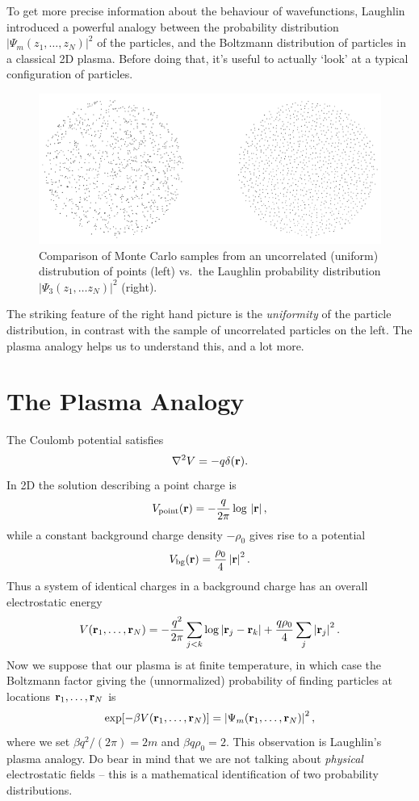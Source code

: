 \documentclass[
  letterpaper,
  DIV=11,
  numbers=noendperiod]{scrreprt}
\begin{document}
To get more precise information about the behaviour of wavefunctions,
Laughlin introduced a powerful analogy between the probability
distribution \(\lvert\Psi_m(z_1,\ldots, z_N)\rvert^2\) of the particles,
and the Boltzmann distribution of particles in a classical 2D plasma.
Before doing that, it's useful to actually `look' at a typical
configuration of particles.

\begin{figure}[H]

{\centering \includegraphics{../assets/LaughlinMonteCarlo.png}

}

\caption{Comparison of Monte Carlo samples from an uncorrelated
(uniform) distrubution of points (left) vs.~the Laughlin probability
distribution \(\lvert\Psi_3(z_1,\ldots z_N)\rvert^2\) (right).}

\end{figure}%

The striking feature of the right hand picture is the \emph{uniformity}
of the particle distribution, in contrast with the sample of
uncorrelated particles on the left. The plasma analogy helps us to
understand this, and a lot more.

\section{The Plasma Analogy}\label{the-plasma-analogy}

The Coulomb potential satisfies \[
\nabla^2 V = -q\delta(\mathbf{r}).
\] In 2D the solution describing a point charge is \[
V_\text{point}(\mathbf{r}) = -\frac{q}{2\pi}\log\,\left|\mathbf{r}\right|,
\] while a constant background charge density \(-\rho_0\) gives rise to
a potential \[
V_\text{bg}(\mathbf{r}) = \frac{\rho_0}{4} \left|\mathbf{r}\right|^2.
\] Thus a system of identical charges in a background charge has an
overall electrostatic energy \[
V(\mathbf{r}_1,\ldots,\mathbf{r}_N) = -\frac{q^2}{2\pi} \sum_{j<k}\log\left|\mathbf{r}_j-\mathbf{r}_k\right| + \frac{q\rho_0}{4}\sum_j \left|\mathbf{r}_j\right|^2.
\] Now we suppose that our plasma is at finite temperature, in which
case the Boltzmann factor giving the (unnormalized) probability of
finding particles at locations \(\mathbf{r}_1, \ldots, \mathbf{r}_N\) is \[
\exp[-\beta V(\mathbf{r}_1, \ldots, \mathbf{r}_N)] = \left|\Psi_m(\mathbf{r}_1, \ldots, \mathbf{r}_N)\right|^2,
\] where we set \(\beta q^2/(2\pi) = 2m\) and \(\beta q\rho_0 = 2\).
This observation is Laughlin's plasma analogy. Do bear in mind that we
are not talking about \emph{physical} electrostatic fields -- this is a
mathematical identification of two probability distributions.
\end{document}
